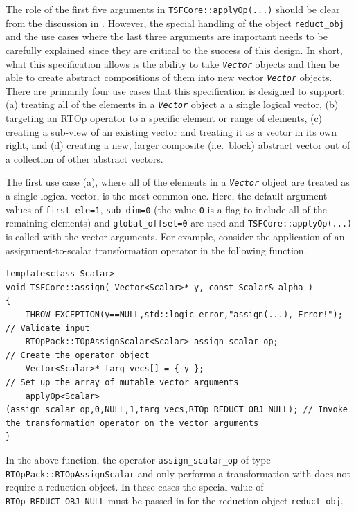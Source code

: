 \documentclass[10pt,fleqn]{article}
\begin{document}
The role of the first five arguments in \texttt{TSFCore::applyOp(...)}
should be clear from the discussion in \cite{ref:rtop_toms}.  However,
the special handling of the object \texttt{reduct\_obj} and the use
cases where the last three arguments are important needs to be
carefully explained since they are critical to the success of this
design.  In short, what this specification allows is the ability to
take \texttt{\textit{Vector}} objects and then be able to create
abstract compositions of them into new vector \texttt{\textit{Vector}}
objects.  There are primarily four use cases
\cite{ref:booch_et_al_1999} that this specification is designed to
support: (a) treating all of the elements in a
\texttt{\textit{Vector}} object a a single logical vector, (b)
targeting an RTOp operator to a specific element or range of elements,
(c) creating a sub-view of an existing vector and treating it as a
vector in its own right, and (d) creating a new, larger composite
(i.e.~block) abstract vector out of a collection of other abstract
vectors.

The first use case (a), where all of the elements in a
\texttt{\textit{Vector}} object are treated as a single logical
vector, is the most common one.  Here, the default argument values of
\texttt{first\_ele=1}, \texttt{sub\_dim=0} (the value \texttt{0} is a
flag to include all of the remaining elements) and
\texttt{global\_offset=0} are used and \texttt{TSFCore::applyOp(...)} is
called with the vector arguments.  For example, consider the
application of an assignment-to-scalar transformation operator
in the following function.

{\scriptsize\begin{verbatim}
template<class Scalar>
void TSFCore::assign( Vector<Scalar>* y, const Scalar& alpha )
{
    THROW_EXCEPTION(y==NULL,std::logic_error,"assign(...), Error!");           // Validate input
    RTOpPack::TOpAssignScalar<Scalar> assign_scalar_op;                        // Create the operator object
    Vector<Scalar>* targ_vecs[] = { y };                                       // Set up the array of mutable vector arguments
    applyOp<Scalar>(assign_scalar_op,0,NULL,1,targ_vecs,RTOp_REDUCT_OBJ_NULL); // Invoke the transformation operator on the vector arguments
}
\end{verbatim}}

In the above function, the operator \texttt{assign\_scalar\_op} of type
\texttt{RTOpPack::RTOpAssignScalar} and only
performs a transformation with does not require a reduction object.
In these cases the special value of \texttt{RTOp\_REDUCT\_OBJ\_NULL}
must be passed in for the reduction object \texttt{reduct\_obj}.
\end{document}
